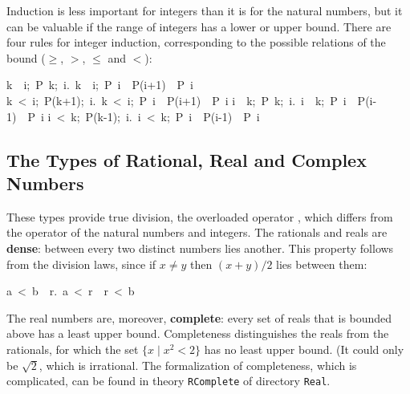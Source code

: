 Induction is less important for integers than it is for the natural numbers, but it can be valuable if the range of integers has a lower or upper bound.  There are four rules for integer induction, corresponding to the possible relations of the bound ($\geq$, $>$, $\leq$ and $<$):
\begin{isabelle}
\isasymlbrakk k\ \isasymle \ i;\ P\ k;\ \isasymAnd i.\ \isasymlbrakk k\ \isasymle \ i;\ P\ i\isasymrbrakk \ \isasymLongrightarrow \ P(i+1)\isasymrbrakk \ \isasymLongrightarrow \ P\ i%
\isanewline
\isasymlbrakk k\ <\ i;\ P(k+1);\ \isasymAnd i.\ \isasymlbrakk k\ <\ i;\ P\ i\isasymrbrakk \ \isasymLongrightarrow \ P(i+1)\isasymrbrakk \ \isasymLongrightarrow \ P\ i%
\isanewline
\isasymlbrakk i\ \isasymle \ k;\ P\ k;\ \isasymAnd i.\ \isasymlbrakk i\ \isasymle \ k;\ P\ i\isasymrbrakk \ \isasymLongrightarrow \ P(i-1)\isasymrbrakk \ \isasymLongrightarrow \ P\ i%
\isanewline
\isasymlbrakk i\ <\ k;\ P(k-1);\ \isasymAnd i.\ \isasymlbrakk i\ <\ k;\ P\ i\isasymrbrakk \ \isasymLongrightarrow \ P(i-1)\isasymrbrakk \ \isasymLongrightarrow \ P\ i%
\end{isabelle}


\subsection{The Types of Rational, Real and Complex Numbers}
\label{sec:real}

%
%
%
These types provide true division, the overloaded operator \isa{/}, 
which differs from the operator  of the 
natural numbers and integers. The rationals and reals are 
\textbf{dense}: between every two distinct numbers lies another.
This property follows from the division laws, since if $x\not=y$ then $(x+y)/2$ lies between them:
\begin{isabelle}
a\ <\ b\ \isasymLongrightarrow \ \isasymexists r.\ a\ <\ r\ \isasymand \ r\ <\ b%
\end{isabelle}

The real numbers are, moreover, \textbf{complete}: every set of reals that
is bounded above has a least upper bound.  Completeness distinguishes the
reals from the rationals, for which the set $\{x\mid x^2<2\}$ has no least
upper bound.  (It could only be $\surd2$, which is irrational. The
formalization of completeness, which is complicated, 
can be found in theory \texttt{RComplete} of directory
\texttt{Real}.

